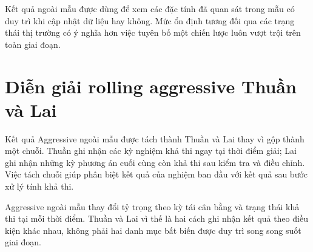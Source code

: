 \documentclass[12pt,a4paper,openany,oneside]{book}
\begin{document}
Kết quả ngoài mẫu được dùng để xem các đặc tính đã quan sát trong mẫu có duy trì khi cập nhật dữ liệu hay không. Mức ổn định tương đối qua các trạng thái thị trường có ý nghĩa hơn việc tuyên bố một chiến lược luôn vượt trội trên toàn giai đoạn.

\section{Diễn giải rolling aggressive Thuần và Lai}\label{Toc227188450}
Kết quả Aggressive ngoài mẫu được tách thành Thuần và Lai thay vì gộp thành một chuỗi. Thuần ghi nhận các kỳ nghiệm khả thi ngay tại thời điểm giải; Lai ghi nhận những kỳ phương án cuối cùng còn khả thi sau kiểm tra và điều chỉnh. Việc tách chuỗi giúp phân biệt kết quả của nghiệm ban đầu với kết quả sau bước xử lý tính khả thi.

Aggressive ngoài mẫu thay đổi tỷ trọng theo kỳ tái cân bằng và trạng thái khả thi tại mỗi thời điểm. Thuần và Lai vì thế là hai cách ghi nhận kết quả theo điều kiện khác nhau, không phải hai danh mục bất biến được duy trì song song suốt giai đoạn.
\end{document}
